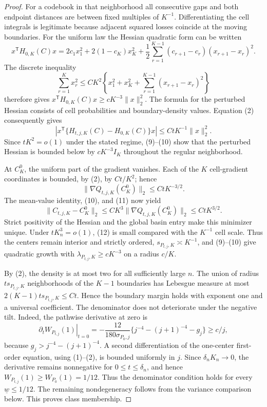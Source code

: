 \documentclass{article}
\begin{document}
\begin{proof}
For a codebook in that neighborhood all consecutive gaps and both endpoint distances are between fixed multiples of \(K^{-1}\).  Differentiating the cell integrals is legitimate because adjacent squared losses coincide at the moving boundaries.  For the uniform law the Hessian quadratic form can be written
\[
 x^{\mathsf T}H_{0,K}(C)x
 =2c_1x_1^2+2(1-c_K)x_K^2
 +\frac12\sum_{r=1}^{K-1}(c_{r+1}-c_r)(x_{r+1}-x_r)^2. \tag{9}
\]
The discrete inequality
\[
 \sum_{r=1}^Kx_r^2\leq C K^2
 \left\{x_1^2+x_K^2+\sum_{r=1}^{K-1}(x_{r+1}-x_r)^2\right\}
\]
therefore gives \(x^{\mathsf T}H_{0,K}(C)x\geq cK^{-3}\|x\|_2^2\).  The formula for the perturbed Hessian consists of cell probabilities and boundary-density values.  Equation (2) consequently gives
\[
 |x^{\mathsf T}\{H_{t,j,K}(C)-H_{0,K}(C)\}x|
 \leq CtK^{-1}\|x\|_2^2. \tag{10}
\]
Since \(tK^2=o(1)\) under the stated regime, (9)--(10) show that the perturbed Hessian is bounded below by \(cK^{-3}I_K\) throughout the regular neighborhood.

At \(C_K^0\), the uniform part of the gradient vanishes.  Each of the \(K\) cell-gradient coordinates is bounded, by (2), by \(Ct/K^2\); hence
\[
 \|\nabla Q_{t,j,K}(C_K^0)\|_2\leq CtK^{-3/2}. \tag{11}
\]
The mean-value identity, (10), and (11) now yield
\[
 \|C_{t,j,K}-C_K^0\|_2
 \leq CK^3\|\nabla Q_{t,j,K}(C_K^0)\|_2
 \leq CtK^{3/2}. \tag{12}
\]
Strict positivity of the Hessian and the global basin entry make this minimizer unique.  Under \(tK_n^3=o(1)\), (12) is small compared with the \(K^{-1}\) cell scale.  Thus the centers remain interior and strictly ordered, \(s_{P_{t,j},K}\asymp K^{-1}\), and (9)--(10) give quadratic growth with \(\lambda_{P_{t,j},K}\geq cK^{-3}\) on a radius \(c/K\).

By (2), the density is at most two for all sufficiently large \(n\).  The union of radius \(ts_{P_{t,j},K}\) neighborhoods of the \(K-1\) boundaries has Lebesgue measure at most \(2(K-1)ts_{P_{t,j},K}\leq Ct\).  Hence the boundary margin holds with exponent one and a universal coefficient.  The denominator does not deteriorate under the negative tilt.  Indeed, the pathwise derivative at zero is
\[
 \left.\partial_tW_{P_{t,j}}(1)\right|_{t=0}
 =-\frac{12}{180\sigma_{P_0,j}}
 \{j^{-4}-(j+1)^{-4}-g_j\}\geq c/j,
\]
because \(g_j>j^{-4}-(j+1)^{-4}\).  A second differentiation of the one-center first-order equation, using (1)--(2), is bounded uniformly in \(j\).  Since \(\delta_nK_n\to0\), the derivative remains nonnegative for \(0\leq t\leq\delta_n\), and hence \(W_{P_{t,j}}(1)\geq W_{P_0}(1)=1/12\).  Thus the denominator condition holds for every \(\underline w\leq1/12\).  The remaining nondegeneracy follows from the variance comparison below.  This proves class membership.


\end{proof}
\end{document}
